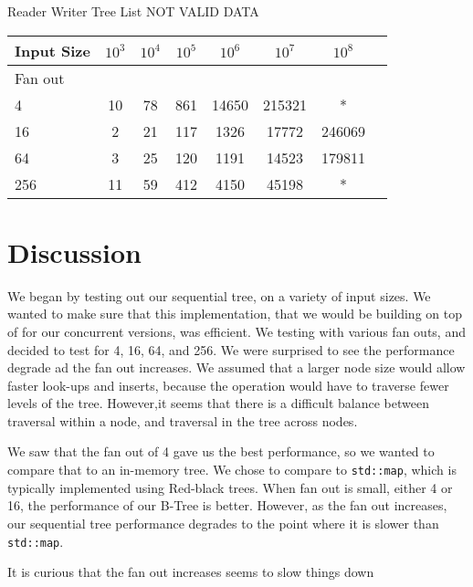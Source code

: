 \documentclass{sig-alternate}
\begin{document}
Reader Writer Tree List NOT VALID DATA \\
\begin{tabular}{| l | c | c | c | c | c | c | r}
  \hline
  Input Size & $10^3$ & $10^4$ & $10^5$ & $10^6$ & $10^7$ & $10^8$ \\ \hline
  Fan out & & & & & &  \\  \hline
  4			&	10 & 78 & 861 & 14650 & 215321 & * \\
  16		&	2 & 21 & 117 & 1326 & 17772 & 246069 \\
  64		&	3 & 25 & 120 & 1191 & 14523 & 179811 \\
  256		&	11 & 59 & 412 & 4150 & 45198 & * \\
  \hline
\end{tabular} 

\section{Discussion}
We began by testing out our sequential tree, on a variety of input sizes.  We wanted to make sure that this implementation, that we would be building on top of for our concurrent versions, was efficient.  We testing with various fan outs, and decided to test for 4, 16, 64, and 256.  We were surprised to see the performance degrade ad the fan out increases.  We assumed that a larger node size would allow faster look-ups and inserts, because the operation would have to traverse fewer levels of the tree.  However,it seems that there is a difficult balance between traversal within a node, and traversal in the tree across nodes.

We saw that the fan out of 4 gave us the best performance, so we wanted to compare that to an in-memory tree.  We chose to compare to \texttt{std::map}, which is typically implemented using Red-black trees.  When fan out is small, either 4 or 16, the performance of our B-Tree is better.  However, as the fan out increases, our sequential tree performance degrades to the point where it is slower than \texttt{std::map}.

It is curious that the fan out increases seems to slow things down
\end{document}
